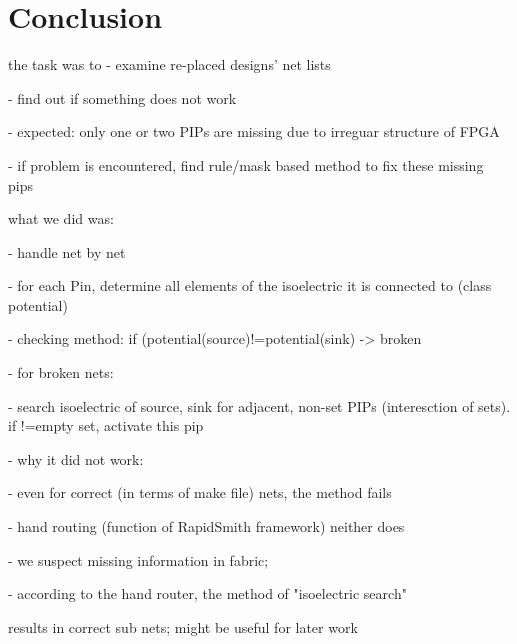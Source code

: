 \chapter{Conclusion}
\label{cha:conclusion}

the task was to
- examine re-placed designs' net lists

- find out if something does not work

- expected: only one or two PIPs are missing due to irreguar structure 
of FPGA

- if problem is encountered, find rule/mask based method to fix these 
missing pips


what we did was:

- handle net by net 

- for each Pin, determine all elements of the isoelectric it is 
connected to (class potential)

- checking method: if (potential(source)!=potential(sink) -> broken


- for broken nets:

 - search isoelectric of source, sink for adjacent, non-set PIPs 
(interesction of sets). if !=empty set, activate this pip


- why it did not work:

  - even for correct (in terms of make file) nets, the method fails

  - hand routing (function of RapidSmith framework) neither does

  - we suspect missing information in fabric;

  - according to the hand router, the method of "isoelectric search" 

results in correct sub nets; might be useful for later work
